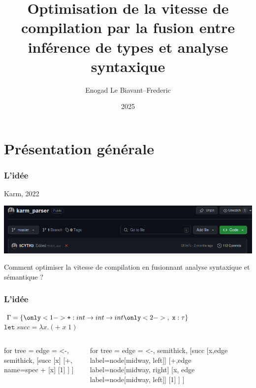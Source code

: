 \documentclass{beamer}
\title{Optimisation de la vitesse de compilation par la fusion entre inférence de types et analyse syntaxique}
\author{Enogad Le Biavant--Frederic}
\institute{Alain René Lesage MPI}
\date{2025}
\begin{document}
\frame{\titlepage}

\section{Présentation générale}
\begin{frame}
		\frametitle{L'idée}
		Karm, 2022
		\begin{center}
				\includegraphics[scale=0.25]{repo}
		\end{center}
		Comment optimiser la vitesse de compilation en fusionnant analyse syntaxique et sémantique ?
\end{frame}

\begin{frame}[fragile]
		\frametitle{L'idée}

		$\Gamma = \{ 
				\only<1->{\texttt +: int \rightarrow int \rightarrow int}
				\only<2->{,\; \texttt x: \tau}
		\}$
		\\
		$\texttt{let} \; succ = \lambda x.(+ \; x \; 1)$
		
		\begin{columns}
				\begin{column}{0.5\textwidth}
						\begin{center}
						\begin{forest}
								for tree = {
										edge = {<-, semithick},
								}
								[succ
										[x]
										[+, name=spec +
												[x]
												[1]	
										]
								]
						\end{forest}
						\end{center}
				\end{column}
				\begin{column}{0.5\textwidth}
						\begin{center}
						\begin{forest}
								for tree = {
										edge = {<-, semithick},
								}
								[succ
								[x,edge label={node[midway, left]{\only<1->{$\{x:\tau\}$}}}]
										[+,edge label={node[midway, right]{\only<3->{$\{\tau = int\}$}}}
												[x, edge label={node[midway, left]{\only<2->{$\{x:\tau\}$}}}]
												[1]	
										]
								]
						\end{forest}
						\end{center}
				\end{column}
		\end{columns}
\end{frame}
\end{document}
